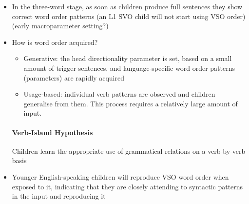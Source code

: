 \documentclass{article}
\begin{document}
\begin{itemize}
    \item In the three-word stage, as soon as children produce full sentences they show correct word order patterns (an L1 SVO child will not start using VSO order) (early macroparameter setting?)
    \item How is word order acquired?
    \begin{itemize}
        \item Generative: the head directionality parameter is set, based on a small amount of trigger sentences, and language-specific word order patterns (parameters) are rapidly acquired
        \item Usage-based: individual verb patterns are observed and children generalise from them. This process requires a relatively large amount of input.
    \end{itemize}
    \paragraph{Verb-Island Hypothesis} Children learn the appropriate use of grammatical relations on a verb-by-verb basis
    \item Younger English-speaking children will reproduce VSO word order when exposed to it, indicating that they are closely attending to syntactic patterns in the input and reproducing it 
\end{itemize}
\end{document}
